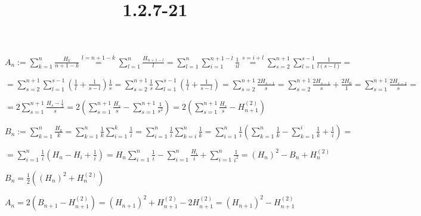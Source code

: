 \documentclass{article}
\title{1.2.7-21}
\begin{document}
\maketitle

\( A_n := \sum_{k=1}^n\frac{H_k}{n+1-k} \overset{l = n + 1 - k}{=} \sum_{l=1}^n \frac{H_{n+1-l}}{l} = \sum_{l=1}^n \sum_{i=1}^{n+1-l}\frac{1}{il} \overset{s=i+l}{=} \sum_{s=2}^{n+1}\sum_{l=1}^{s-1}\frac{1}{l(s-l)} = \)

\( = \sum_{s=2}^{n+1}\sum_{l=1}^{s-1}(\frac{1}{l} + \frac{1}{s-l})\frac{1}{s} = \sum_{s=2}^{n+1}\frac{1}{s}\sum_{l=1}^{s-1}(\frac{1}{l} + \frac{1}{s-l}) = \sum_{s=2}^{n+1}\frac{2H_{s-1}}{s} = \sum_{s=2}^{n+1}\frac{2H_{s-1}}{s} + \frac{2H_0}{1} = \sum_{s=1}^{n+1}\frac{2H_{s-1}}{s} = \)

\( = 2 \sum_{s=1}^{n+1} \frac{H_s - \frac{1}{s}}{s} = 2 (\sum_{s=1}^{n+1} \frac{H_s}{s} - \sum_{s=1}^{n+1} \frac{1}{s^2}) = 2(\sum_{s=1}^{n+1} \frac{H_s}{s} - H_{n+1}^{(2)}) \)

\( B_n := \sum_{k=1}^n \frac{H_k}{k} = \sum_{k=1}^{n}\frac{1}{k}\sum_{i=1}^k \frac{1}{i} = \sum_{i=1}^n \frac{1}{i}\sum_{k=i}^n \frac{1}{k} = \sum_{i=1}^n \frac{1}{i}(\sum_{k=1}^n \frac{1}{k} - \sum_{k=1}^i \frac{1}{k} + \frac{1}{i}) = \)

\( = \sum_{i=1}^n \frac{1}{i}(H_n - H_i + \frac{1}{i}) = H_n \sum_{i=1}^n \frac{1}{i} - \sum_{i=1}^n \frac{H_i}{i} + \sum_{i=1}^n \frac{1}{i^2} = (H_n)^2 - B_n + H_n^{(2)} \)

\( B_n = \frac{1}{2}((H_n)^2 + H_n^{(2)}) \)

\( A_n = 2(B_{n+1} - H_{n+1}^{(2)}) = (H_{n+1})^2 + H_{n+1}^{(2)} - 2H_{n+1}^{(2)} = (H_{n+1})^2 - H_{n+1}^{(2)} \)
\end{document}

